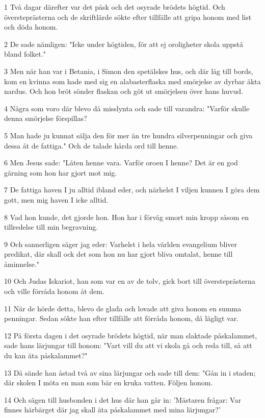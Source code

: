 \par 1 Två dagar därefter var det påsk och det osyrade brödets högtid. Och översteprästerna och de skriftlärde sökte efter tillfälle att gripa honom med list och döda honom.
\par 2 De sade nämligen: "Icke under högtiden, för att ej oroligheter skola uppstå bland folket."
\par 3 Men när han var i Betania, i Simon den spetälskes hus, och där låg till bords, kom en kvinna som hade med sig en alabasterflaska med smörjelse av dyrbar äkta nardus. Och hon bröt sönder flaskan och göt ut smörjelsen över hans huvud.
\par 4 Några som voro där blevo då misslynta och sade till varandra: "Varför skulle denna smörjelse förspillas?
\par 5 Man hade ju kunnat sälja den för mer än tre hundra silverpenningar och giva dessa åt de fattiga." Och de talade hårda ord till henne.
\par 6 Men Jesus sade: "Låten henne vara. Varför oroen I henne? Det är en god gärning som hon har gjort mot mig.
\par 7 De fattiga haven I ju alltid ibland eder, och närhelst I viljen kunnen I göra dem gott, men mig haven I icke alltid.
\par 8 Vad hon kunde, det gjorde hon. Hon har i förväg smort min kropp såsom en tillredelse till min begravning.
\par 9 Och sannerligen säger jag eder: Varhelst i hela världen evangelium bliver predikat, där skall ock det som hon nu har gjort bliva omtalat, henne till åminnelse."
\par 10 Och Judas Iskariot, han som var en av de tolv, gick bort till översteprästerna och ville förråda honom åt dem.
\par 11 När de hörde detta, blevo de glada och lovade att giva honom en summa penningar. Sedan sökte han efter tillfälle att förråda honom, då lägligt var.
\par 12 På första dagen i det osyrade brödets högtid, när man slaktade påskalammet, sade hans lärjungar till honom: "Vart vill du att vi skola gå och reda till, så att du kan äta påskalammet?"
\par 13 Då sände han åstad två av sina lärjungar och sade till dem: "Gån in i staden; där skolen I möta en man som bär en kruka vatten. Följen honom.
\par 14 Och sägen till husbonden i det hus där han går in: 'Mästaren frågar: Var finnes härbärget där jag skall äta påskalammet med mina lärjungar?'
